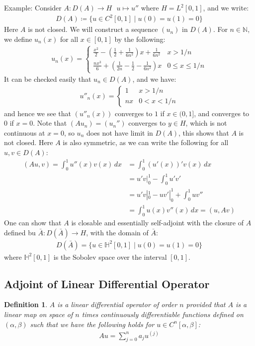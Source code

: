 \documentclass[11pt]{book}
\theoremstyle{break}
\theoremstyle{break}
\newtheorem{defn}{Definition}[corL]
\newcommand{\N}{\mathbb{N}}
\newcommand{\example}{\color{green}Example: \color{black}}
\begin{document}
\example Consider $A:D(A) \to H \ \ \ u\mapsto u''$ where $H = L^2[0,1]$, and we write:
\begin{align*}
D(A) \coloneqq \{ u \in C^2[0,1]\mid u(0) = u(1) = 0\}
\end{align*}
Here $A$ is not closed. We will construct a sequence $(u_n)$ in $D(A)$. For $n \in \N$, we define $u_n(x)$ for all $x \in [0,1]$ by the following:
\begin{align*}
u_n(x) = \begin{cases}
\frac{x^2}{2} - \left( \frac{1}{2} + \frac{1}{6n^2}\right) x + \frac{1}{6n^2} & x>1/n\\
\frac{nx^3}{6} + \left(\frac{1}{2n}-\frac{1}{2} - \frac{1}{6n^2}\right) x & 0\leq x\leq 1/n
\end{cases}
\end{align*}
It can be checked easily that $u_n \in D(A)$, and we have:
\begin{align*}
u''_n(x) = \begin{cases} 1 & x>1/n \\ nx & 0<x<1/n\end{cases}
\end{align*}
and hence we see that $(u''_n(x))$ converges to $1$ if $x \in (0,1]$, and converges to $0$ if $x = 0$. Note that $(Au_n) = (u_n'')$ converges to $y \in H$, which is not continuous at $x=0$, so $u_n$ does not have limit in $D(A)$, this shows that $A$ is not closed. Here $A$ is also symmetric, as we can write the following for all $u,v \in D(A)$:
\begin{align*}
(Au,v) = \int_0^1 u''(x)v(x)\, dx &= \int_0^1 (u'(x))'v(x)\, dx\\
& = u'v|_{0}^1 - \int_0^1 u'v' \\
&= u'v|_{0}^1 - uv'|_{0}^1 + \int_0^1 uv'' \\
&= \int_0^1 u(x)v''(x)\, dx = (u,Av)
\end{align*}
One can show that $A$ is closable and essentially self-adjoint with the closure of $A$ defined bu $\bar{A}:D(\bar{A}) \to H$, with the domain of $\bar{A}$:
\begin{align*}
D(\bar{A}) = \{ u \in \mathbb{H}^2[0,1] \mid u(0) = u(1) = 0\}
\end{align*}
where $\mathbb{H}^2[0,1]$ is the Sobolev space over the interval $[0,1]$.\\

\subsection{Adjoint of Linear Differential Operator}
\begin{defn}
$A$ is a linear differential operator of order $n$ provided that $A$ is a linear map on space of $n$ times continuously differentiable functions defined on $(\alpha,\beta)$ such that we have the following holds for $u \in C^n[\alpha,\beta]$:
\begin{align*}
Au = \sum_{j=0}^n a_j u^{(j)}
\end{align*}	
\end{defn}
\end{document}
